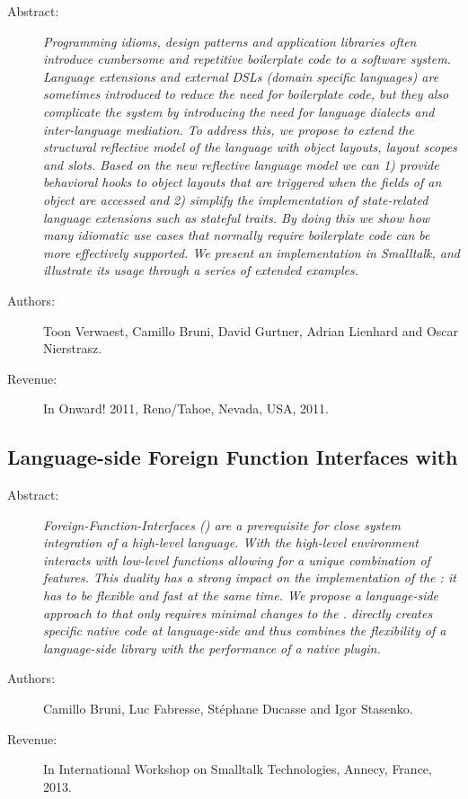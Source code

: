 \begin{description}
	\item[Abstract:] \emph{
Programming idioms, design patterns and application libraries often introduce cumbersome and repetitive boilerplate code to a software system.
Language extensions and external {DSLs} (domain specific languages) are sometimes introduced to reduce the need for boilerplate code, but they also complicate the system by introducing the need for language dialects and inter-language mediation.
To address this, we propose to extend the structural reflective model of the language with object layouts, layout scopes and slots.
Based on the new reflective language model we can 1) provide behavioral hooks to object layouts that are triggered when the fields of an object are accessed and 2) simplify the implementation of state-related language extensions such as stateful traits.
By doing this we show how many idiomatic use cases that normally require boilerplate code can be more effectively supported.
We present an implementation in Smalltalk, and illustrate its usage through a series of extended examples.}

	\item[Authors:] Toon Verwaest, Camillo Bruni, David Gurtner, Adrian Lienhard and Oscar Nierstrasz. 
	\item[Revenue:] In Onward! 2011, Reno/Tahoe, Nevada, USA, 2011.
\end{description}

\subsection{Language-side Foreign Function Interfaces with \NB}
\begin{description}
	\item[Abstract:] \emph{
		Foreign-Function-Interfaces (\FFIs) are a prerequisite for close system integration of a high-level language.
		With \FFIs the high-level environment interacts with low-level functions allowing for a unique combination of features.
		This duality has a strong impact on the implementation of the \FFI: it has to be flexible and fast at the same time.
		We propose \NB a language-side approach to \FFIs that only requires minimal changes to the \VM.
		\NB directly creates specific native code at language-side and thus combines the flexibility of a language-side library with the performance of a native plugin.}

	\item[Authors:] Camillo Bruni, Luc Fabresse, Stéphane Ducasse and Igor Stasenko. 
	\item[Revenue:] In International Workshop on Smalltalk Technologies, Annecy, France, 2013.
\end{description}



